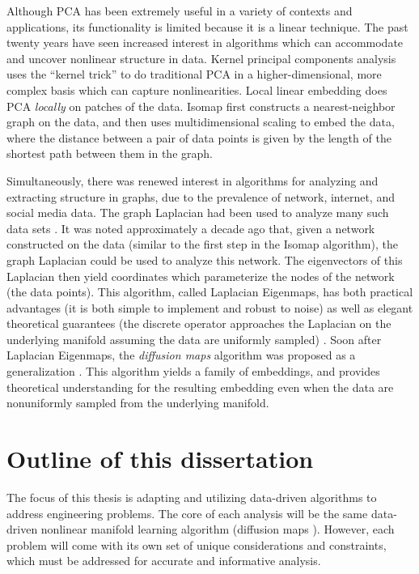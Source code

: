Although PCA has been extremely useful in a variety of contexts and applications, its functionality is limited because it is a linear technique. 
%
The past twenty years have seen increased interest in algorithms which can accommodate and uncover nonlinear structure in data.
%
Kernel principal components analysis \cite{scholkopf1997kernel} uses the ``kernel trick'' to do traditional PCA in a higher-dimensional, more complex basis which can capture nonlinearities. 
%
Local linear embedding \cite{roweis2000nonlinear} does PCA {\em locally} on patches of the data. 
%
Isomap \cite{tenenbaum2000global} first constructs a nearest-neighbor graph on the data, and then uses multidimensional scaling \cite{joseph1978multidimensional} to embed the data, where the distance between a pair of data points is given by the length of the shortest path between them in the graph. 

Simultaneously, there was renewed interest in algorithms for analyzing and extracting structure in graphs, due to the prevalence of network, internet, and social media data. 
%
The graph Laplacian had been used to analyze many such data sets \cite{shi2000normalized, ng2002spectral}. 
%
It was noted approximately a decade ago that, given a network constructed on the data (similar to the first step in the Isomap algorithm), the graph Laplacian could be used to analyze this network. 
%
The eigenvectors of this Laplacian then yield coordinates which parameterize the nodes of the network (the data points). 
%
This algorithm, called Laplacian Eigenmaps, has both practical advantages (it is both simple to implement and robust to noise) as well as elegant theoretical guarantees (the discrete operator approaches the Laplacian on the underlying manifold assuming the data are uniformly sampled) \cite{Belkin2003}. 
%
Soon after Laplacian Eigenmaps, the {\em diffusion maps} algorithm was proposed as a generalization \cite{coifman2005geometric, coifman2006geometric}. 
%
This algorithm yields a family of embeddings, and provides theoretical understanding for the resulting embedding even when the data are nonuniformly sampled from the underlying manifold. 


\section{Outline of this dissertation}

The focus of this thesis is adapting and utilizing data-driven algorithms to address engineering problems. 
%
The core of each analysis will be the same data-driven nonlinear manifold learning algorithm (diffusion maps \citep{Coifman2006}). 
%
However, each problem will come with its own set of unique considerations and constraints, which must be addressed for accurate and informative analysis. 

